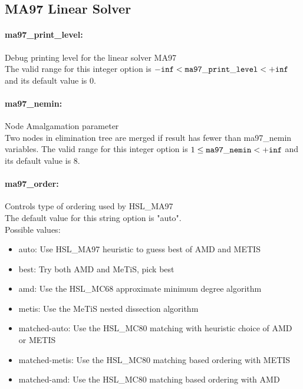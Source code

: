 \subsection{MA97 Linear Solver}

\paragraph{ma97\_print\_level:}\label{opt:ma97_print_level} Debug printing level for the linear solver MA97 \\
 The valid range for this integer option is
${\tt -inf} <  {\tt ma97\_print\_level } <  {\tt +inf}$
and its default value is $0$.


\paragraph{ma97\_nemin:}\label{opt:ma97_nemin} Node Amalgamation parameter \\
 Two nodes in elimination tree are merged if result has fewer than ma97\_nemin variables. The valid range for this integer option is
$1 \le {\tt ma97\_nemin } <  {\tt +inf}$
and its default value is $8$.


\paragraph{ma97\_order:}\label{opt:ma97_order} Controls type of ordering used by HSL\_MA97 \\
 The default value for this string option is "auto".
\\ 
Possible values:
\begin{itemize}
   \item auto: Use HSL\_MA97 heuristic to guess best of AMD and METIS
   \item best: Try both AMD and MeTiS, pick best
   \item amd: Use the HSL\_MC68 approximate minimum degree algorithm
   \item metis: Use the MeTiS nested dissection algorithm
   \item matched-auto: Use the HSL\_MC80 matching with heuristic choice of AMD or METIS
   \item matched-metis: Use the HSL\_MC80 matching based ordering with METIS
   \item matched-amd: Use the HSL\_MC80 matching based ordering with AMD
\end{itemize}


